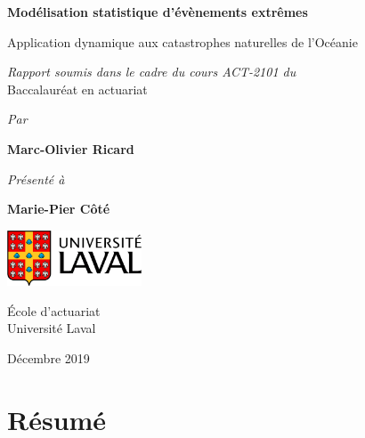 \documentclass[11pt]{report}
\numberwithin{equation}{section}
\begin{document}



\begin{titlepage}
    \begin{center}
        \vspace*{1cm}
        
        \Large
        \textbf{Modélisation statistique d'évènements extrêmes}
        
        \large
        \vspace{0.4cm}
        
        Application dynamique aux catastrophes naturelles de l'Océanie
 
        \vspace{3cm}
 
        \textit{Rapport soumis dans le cadre du cours ACT-2101 du} \\
        Baccalauréat en actuariat
 
        \vspace{1cm}
        
        \textit{Par}
 
        \textbf{Marc-Olivier Ricard}
        
        \vspace{1cm}
        
        \textit{Présenté à}
 
        \textbf{Marie-Pier Côté}
 
        \vfill
 
        \includegraphics[width=0.3\textwidth]{Laval.PNG}
        
        \vspace{1.5cm}
 
        École d'actuariat\\
        Université Laval\\
        
        \vspace{0.5cm}
        
        Décembre 2019
 
    \end{center}
\end{titlepage}


\tableofcontents
\cleardoublepage


\chapter*{Résumé}
\label{chap:résumé} 
\end{document}
